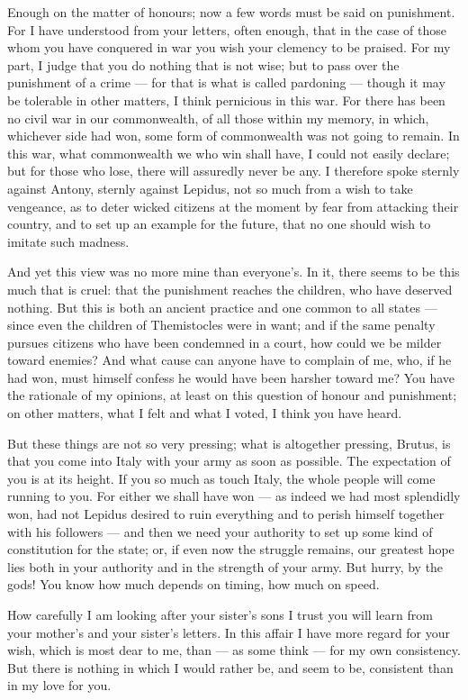  Enough on the matter of honours; now a few words must be said on punishment. For I have understood from your letters, often enough, that in the case of those whom you have conquered in war you wish your clemency to be praised. For my part, I judge that you do nothing that is not wise; but to pass over the punishment of a crime --- for that is what is called pardoning --- though it may be tolerable in other matters, I think pernicious in this war. For there has been no civil war in our commonwealth, of all those within my memory, in which, whichever side had won, some form of commonwealth was not going to remain. In this war, what commonwealth we who win shall have, I could not easily declare; but for those who lose, there will assuredly never be any. I therefore spoke sternly against Antony, sternly against Lepidus, not so much from a wish to take vengeance, as to deter wicked citizens at the moment by fear from attacking their country, and to set up an example for the future, that no one should wish to imitate such madness.

 And yet this view was no more mine than everyone's. In it, there seems to be this much that is cruel: that the punishment reaches the children, who have deserved nothing. But this is both an ancient practice and one common to all states --- since even the children of Themistocles were in want; and if the same penalty pursues citizens who have been condemned in a court, how could we be milder toward enemies? And what cause can anyone have to complain of me, who, if he had won, must himself confess he would have been harsher toward me? You have the rationale of my opinions, at least on this question of honour and punishment; on other matters, what I felt and what I voted, I think you have heard.

 But these things are not so very pressing; what is altogether pressing, Brutus, is that you come into Italy with your army as soon as possible. The expectation of you is at its height. If you so much as touch Italy, the whole people will come running to you. For either we shall have won --- as indeed we had most splendidly won, had not Lepidus desired to ruin everything and to perish himself together with his followers --- and then we need your authority to set up some kind of constitution for the state; or, if even now the struggle remains, our greatest hope lies both in your authority and in the strength of your army. But hurry, by the gods! You know how much depends on timing, how much on speed.

 How carefully I am looking after your sister's sons I trust you will learn from your mother's and your sister's letters. In this affair I have more regard for your wish, which is most dear to me, than --- as some think --- for my own consistency. But there is nothing in which I would rather be, and seem to be, consistent than in my love for you.
